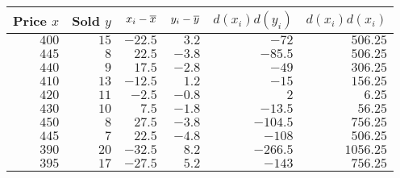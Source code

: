 \begin{tabular}{rrrrrr} \toprule
Price $x$ & Sold $y$ & $x_i - \overline{x}$ & $y_i - \overline{y}$ & $d(x_i)d(y_i)$ & $d(x_i)d(x_i)$ \\\midrule
$400$     & $15$     & $-22.5$       & $3.2$         & $-72$         & $506.25$       \\
$445$     & $8$      & $22.5$        & $-3.8$        & $-85.5$       & $506.25$       \\
$440$     & $9$      & $17.5$        & $-2.8$        & $-49$         & $306.25$       \\
$410$     & $13$     & $-12.5$       & $1.2$         & $-15$         & $156.25$       \\
$420$     & $11$     & $-2.5$        & $-0.8$        & $2$           & $6.25$         \\
$430$     & $10$     & $7.5$         & $-1.8$        & $-13.5$       & $56.25$        \\
$450$     & $8$      & $27.5$        & $-3.8$        & $-104.5$      & $756.25$       \\
$445$     & $7$      & $22.5$        & $-4.8$        & $-108$        & $506.25$       \\
$390$     & $20$     & $-32.5$       & $8.2$         & $-266.5$      & $1056.25$      \\
$395$     & $17$     & $-27.5$       & $5.2$         & $-143$        & $756.25$       \\\bottomrule
\end{tabular}
